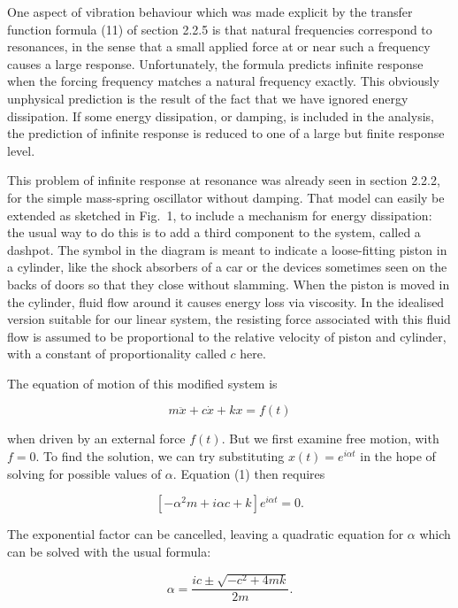   One aspect of vibration behaviour which was made explicit by the transfer 
  function formula (11) of section 2.2.5 is that natural frequencies correspond 
  to resonances, in the sense that a small applied force at or near such a 
  frequency causes a large response. Unfortunately, the formula predicts 
  infinite response when the forcing frequency matches a natural frequency 
  exactly. This obviously unphysical prediction is the result of the fact that 
  we have ignored energy dissipation. If some energy dissipation, or damping, 
  is included in the analysis, the prediction of infinite response is reduced 
  to one of a large but finite response level. 

  This problem of infinite response at resonance was already seen in section 
  2.2.2, for the simple mass-spring oscillator without damping. That model can 
  easily be extended as sketched in Fig.\ 1, to include a mechanism for energy 
  dissipation: the usual way to do this is to add a third component to the 
  system, called a dashpot. The symbol in the diagram is meant to indicate a 
  loose-fitting piston in a cylinder, like the shock absorbers of a car or the 
  devices sometimes seen on the backs of doors so that they close without 
  slamming. When the piston is moved in the cylinder, fluid flow around it 
  causes energy loss via viscosity. In the idealised version suitable for our 
  linear system, the resisting force associated with this fluid flow is assumed 
  to be proportional to the relative velocity of piston and cylinder, with a 
  constant of proportionality called $c$ here. 


  The equation of motion of this modified system is 

  $$m \ddot{x}+c\dot{x} +kx=f(t) \tag{1} $$ 

  when driven by an external force $f(t)$. But we first examine free motion, 
  with $f=0$. To find the solution, we can try substituting $x(t)=e^{i \alpha 
  t}$ in the hope of solving for possible values of $\alpha$. Equation (1) then 
  requires 

  $$[-\alpha^2 m +i \alpha c + k] e^{i \alpha t} =0. \tag{2} $$ 

  The exponential factor can be cancelled, leaving a quadratic equation for 
  $\alpha$ which can be solved with the usual formula: 

  $$\alpha = \dfrac{ic \pm \sqrt{-c^2 + 4 m k}}{2m}. \tag{3}$$ 


